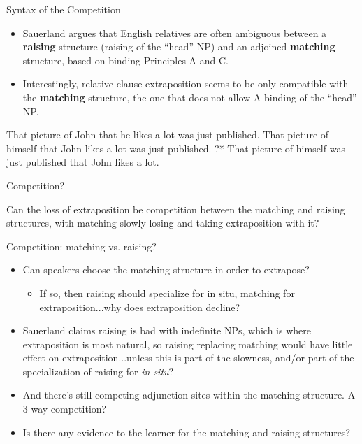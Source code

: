 \documentclass[hyperref={pdfpagelabels=false}]{beamer}
\begin{document}
\begin{frame}{Syntax of the Competition \citet{sauerland2003}}
 \begin{itemize}
	\item Sauerland argues that English relatives are often ambiguous between a \textbf{raising} structure (raising of the ``head'' NP) and an adjoined \textbf{matching} structure, based on binding Principles A and C.
	\item Interestingly, relative clause extraposition seems to be only compatible with the \textbf{matching} structure, the one that does not allow A binding of the ``head'' NP.
\end{itemize}

\begin{exe}
	\ex That picture of John that he likes a lot was just published.
	\ex That picture of himself that John likes a lot was just published.
	\ex ?* That picture of himself was just published that John likes a lot.
\end{exe}
\end{frame}

\begin{frame}{Competition? \citet{sauerland2003}}
 
 Can the loss of extraposition be competition between the matching and raising structures, with matching slowly losing and taking extraposition with it?\\

\end{frame}



\begin{frame}{Competition: matching vs. raising? }

 \begin{itemize}
	\item Can speakers choose the matching structure in order to extrapose? 
		\begin{itemize}
			\item If so, then raising should specialize for in situ, matching for extraposition...why does extraposition decline?
		\end{itemize}
	\item Sauerland claims raising is bad with indefinite NPs, which is where extraposition is most natural, so raising replacing matching would have little effect on extraposition...unless this is part of the slowness, and/or part of the specialization of raising for \textsl{in situ}?
	\item And there's still competing adjunction sites within the matching structure. A 3-way competition?
	\item Is there any evidence to the learner for the matching and raising structures?
\end{itemize}


\end{frame}
\end{document}
